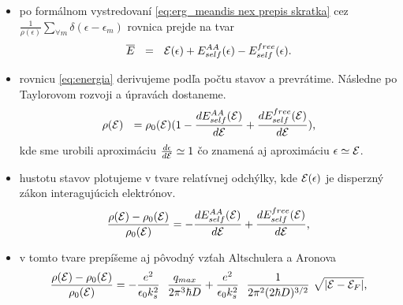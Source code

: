 \documentclass[
	11pt, %
]{beamer}
\begin{document}
\begin{frame}

\begin{itemize}
\item po formálnom vystredovaní \eqref{eq:erg_meandis nex prepis skratka} cez $\frac{1}{\rho(\epsilon)}\sum_{\forall m} \delta(\epsilon-\epsilon_{m})$
rovnica prejde na tvar
\begin{equation}
\label{eq:energia}
 \overline{E} \ \ = \ \ \mathcal{E}(\epsilon) + E_{self}^{AA}(\epsilon) - E_{self}^{free}(\epsilon)  \text{.}
\end{equation}
\item rovnicu \eqref{eq:energia} derivujeme podľa počtu stavov a prevrátime. Následne po Taylorovom rozvoji a úpravách dostaneme.
 \begin{equation}\label{eq:erg_meandis nex prepis skratka7}
\rho(\mathcal{E}) \ \ = \rho_0(\mathcal{E}) (1 - \frac{dE_{self}^{AA}(\mathcal{E})}{d\mathcal{E}} + \frac{dE_{self}^{free}(\mathcal{E})}{d\mathcal{E}}) \text{,}
\end{equation}
kde sme urobili aproximáciu $\frac{d\epsilon}{d\mathcal{E}} \simeq 1$  čo znamená aj aproximáciu $\epsilon \simeq \mathcal{E}$.
\item hustotu stavov plotujeme v tvare relatívnej odchýlky, kde $\mathcal{E}(\epsilon)$ je disperzný zákon interagujúcich elektrónov.
\begin{equation}\label{eq:erg_hustota stavov relat}
\frac{\rho(\mathcal{E}) - \rho_0(\mathcal{E})}{\rho_0(\mathcal{E})} = - \frac{dE_{self}^{AA}(\mathcal{E})}{d\mathcal{E}} + \frac{dE_{self}^{free}(\mathcal{E})}{d\mathcal{E}} \text{,}
\end{equation}
\item v tomto tvare prepíšeme aj pôvodný vzťah Altschulera a Aronova
\begin{equation}\label{eq:erg_hustota stavov relat povodny}
\frac{\rho(\mathcal{E}) - \rho_0(\mathcal{E})}{\rho_0(\mathcal{E})} = - \frac{e^{2}}{\epsilon_0 k_s^{2}}\ \  \frac{q_{max}}{2\pi^3 \hbar D}
 +  \frac{e^{2}}{\epsilon_0 k_s^{2}} \ \ \frac{1}{2\pi^2 (2\hbar D)^{3/2}}  \ \sqrt{|\mathcal{E}-\mathcal{E}_F|} \text{,}
\end{equation}
\end{itemize}
\end{frame}
\end{document}
